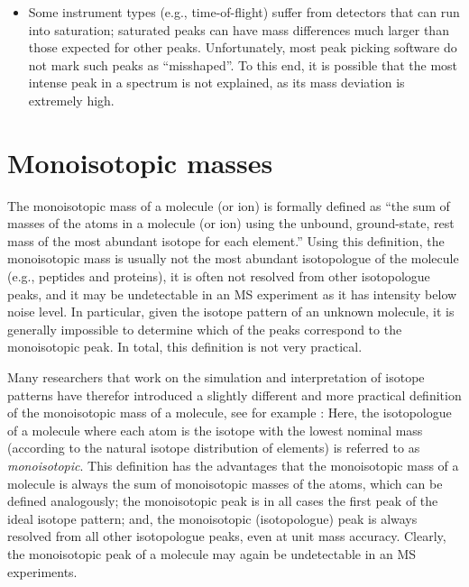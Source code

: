 \documentclass[letterpaper,10pt,openany,oneside]{sphinxmanual}
\begin{document}
\begin{itemize}
\item Some instrument types (e.g., time-of-flight) suffer from detectors that
  can run into saturation; saturated peaks can have mass differences much
  larger than those expected for other peaks.  Unfortunately, most peak
  picking software do not mark such peaks as ``misshaped''.  To this end, it
  is possible that the most intense peak in a spectrum is not explained, as
  its mass deviation is extremely high.
\end{itemize}



\section{Monoisotopic masses}

The monoisotopic mass of a molecule (or ion) is formally defined as ``the sum
of masses of the atoms in a molecule (or ion) using the unbound,
ground-state, rest mass of the most abundant isotope for each element.''
Using this definition, the monoisotopic mass is usually not the most abundant
isotopologue of the molecule (e.g., peptides and proteins), it is often not
resolved from other isotopologue peaks, and it may be undetectable in an
MS experiment as it has intensity below noise level.  In particular, given
the isotope pattern of an unknown molecule, it is generally impossible to
determine which of the peaks correspond to the monoisotopic peak.  In total,
this definition is not very practical.

Many researchers that work on the simulation and interpretation of isotope
patterns have therefor introduced a slightly different and more practical
definition of the monoisotopic mass of a molecule, see for
example \citet{dittwald15fine, meusel16predicting}: Here, the isotopologue of
a molecule where each atom is the isotope with the lowest nominal mass
(according to the natural isotope distribution of elements) is referred to
as \emph{monoisotopic}.  This definition has the advantages that the
monoisotopic mass of a molecule is always the sum of monoisotopic masses of
the atoms, which can be defined analogously; the monoisotopic peak is in all
cases the first peak of the ideal isotope pattern; and, the monoisotopic
(isotopologue) peak is always resolved from all other isotopologue peaks,
even at unit mass accuracy.  Clearly, the monoisotopic peak of a molecule may
again be undetectable in an MS experiments.
\end{document}

